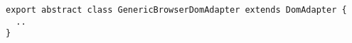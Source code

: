 \begin{verbatim}
export abstract class GenericBrowserDomAdapter extends DomAdapter {
  ..
}
\end{verbatim}
